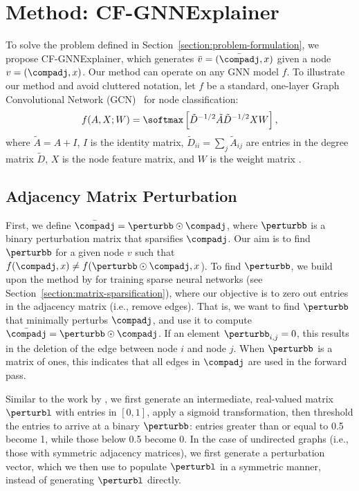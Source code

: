 
\section{Method: CF-GNNExplainer}
\label{section:cfgnn-method}



To solve the problem defined in Section~\ref{section:problem-formulation}, we propose CF-GNNExplainer, which generates $\bar{v} = (\bar{\compadj}, x)$ given a node $v = (\compadj, x)$.
Our method can operate on any GNN model $f$. 
To illustrate our method and avoid cluttered notation, let $f$ be a standard, one-layer Graph Convolutional Network (GCN)~\citep{kipf_semi_supervised_2017} for node classification:
\begin{align}
    \label{eq:gcn}
    f(A, X; W) = \softmax\left[\tilde{D}^{-1/2} \tilde{A} \tilde{D}^{-1/2} X W \right], 
\end{align}
where $\tilde{A} = A + I$, $I$ is the identity matrix, $\tilde{D}_{ii} = \sum_j \tilde{A}_{ij}$ are entries in the degree matrix $\tilde{D}$, $X$ is the node feature matrix, and $W$ is the weight matrix \citep{kipf_semi_supervised_2017}. 







\subsection{Adjacency Matrix Perturbation}
\label{section:adjacency-perturb}
First, we define $\bar{\compadj} = \perturbb \odot \compadj$, where $\perturbb$ is a binary perturbation matrix that sparsifies $\compadj$. 
Our aim is to find $\perturbb$ for a given node $v$ such that $f(\compadj, x) \neq f(\perturbb \odot \compadj, x$). 
To find $\perturbb$, we build upon the method by \citet{srinivas_training_2016} for training sparse neural networks (see Section~\ref{section:matrix-sparsification}), where our objective is to zero out entries in the adjacency matrix (i.e., remove edges).
That is, we want to find $\perturbb$ that minimally perturbs $\compadj$, and use it to compute $\bar{\compadj} = \perturbb \odot \compadj$. 
If an element $\perturbb_{{i,j}} = 0$, this results in the deletion of the edge between node $i$ and node $j$. 
When $\perturbb$ is a matrix of ones, this indicates that all edges in $\compadj$ are used in the forward pass. 

Similar to the work by \citet{srinivas_training_2016}, we first generate an intermediate, real-valued matrix $\perturbl$ with entries in $\left[0, 1\right]$, apply a sigmoid transformation, then threshold the entries to arrive at a binary $\perturbb$: entries greater than or equal to 0.5 become 1, while those below 0.5 become 0. 
In the case of undirected graphs (i.e., those with symmetric adjacency matrices), we first generate a perturbation vector, which we then use to populate $\perturbl$ in a symmetric manner, instead of generating $\perturbl$ directly. 

